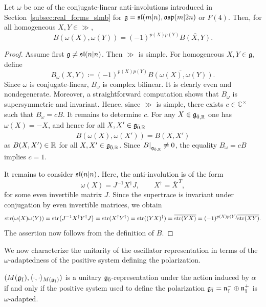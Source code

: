 \begin{lemma}\label{lemm::B_omega_consistent}
 Let $\omega$ be one of the conjugate-linear anti-involutions introduced in Section~\ref{subsec:real_forms_slmb} for $\gg=\sl(m\vert n), \osp(m\vert 2n)$ or $F(4)$. Then, for all homogeneous $X,Y\in\gg$,
 \[
 B(\omega(X),\omega(Y))
 =
 (-1)^{p(X)p(Y)}\overline{B(X,Y)}.
 \]
\end{lemma}


\begin{proof} Assume first $\gg \neq \sl(n\vert n)$. Then $\gg$ is simple. 
For homogeneous $X,Y\in\mathfrak{g}$, define
\[
B_{\omega}(X,Y)
\coloneqq
(-1)^{p(X)p(Y)}
\overline{B(\omega(X),\omega(Y))}.
\]
Since $\omega$ is conjugate-linear, $B_{\omega}$ is complex bilinear.
It is clearly even and nondegenerate. Moreover, a straightforward computation shows that $B_{\omega}$ is supersymmetric and invariant. Hence, since $\gg$ is simple, 
there exists $c\in\mathbb{C}^{\times}$ such that
$
B_{\omega}=cB.
$ It remains to determine $c$. For any $X \in \gg_{\bar{0},\RR}$ one has $\omega(X)=-X$, and hence for all $X,X'\in \gg_{\bar{0},\RR}$
\[
B(\omega(X),\omega(X'))
=
\overline{B(X,X')}
\]
as $B(X,X')\in \RR$ for all $X,X' \in \gg_{\bar{0},\RR}$. Since $\left.B\right|_{\gg_{\bar0,\RR}}\not\equiv0$, the equality
$B_{\omega}=cB$ implies $c=1$.

It remains to consider $\sl(n\vert n)$. Here, the anti-involution is of the form
 \[
 \omega(X)=J^{-1}X^{\dagger}J,
 \qquad
 X^{\dagger}=\overline{X}^{\,T},
 \]
 for some even invertible matrix $J$. Since the supertrace is invariant under
 conjugation by even invertible matrices, we obtain
 \begin{equation*}
  \str(\omega(X)\omega(Y))
  =
  \str\bigl(J^{-1}X^{\dagger}Y^{\dagger}J\bigr)
  =
  \str(X^{\dagger}Y^{\dagger})
  =
  \str((YX)^{\dagger})
  =
  \overline{\str(YX)}
  =
  (-1)^{p(X)p(Y)}\overline{\str(XY)}.
 \end{equation*}
 The assertion now follows from the definition of $B$.
\end{proof}

We now characterize the unitarity of the oscillator representation in terms of the $\omega$-adaptedness of the positive system defining the polarization.

\begin{proposition}\label{prop::unitarity_oscillator_representation}
$(M(\odd),\langle\cdot,\cdot\rangle_{M(\odd)})$ is a unitary
 $\even$-representation under the action induced by $\alpha$ if and only if
 the positive system used to define the polarization $\odd=\nn_{\bar1}^{-}\oplus\nn_{\bar1}^{+}$
 is $\omega$-adapted.
\end{proposition}


